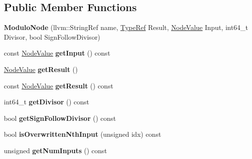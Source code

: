 \subsection*{Public Member Functions}
\begin{DoxyCompactItemize}
\item 
\mbox{\label{classglow_1_1_modulo_node_a1859853b905fcf3fc8984dd8b50b750f}} 
{\bfseries Modulo\+Node} (llvm\+::\+String\+Ref name, \hyperlink{structglow_1_1_type}{Type\+Ref} Result, \hyperlink{structglow_1_1_node_value}{Node\+Value} Input, int64\+\_\+t Divisor, bool Sign\+Follow\+Divisor)
\item 
\mbox{\label{classglow_1_1_modulo_node_a3dc9fccaff2389abe6e650c4c08a8a70}} 
const \hyperlink{structglow_1_1_node_value}{Node\+Value} {\bfseries get\+Input} () const
\item 
\mbox{\label{classglow_1_1_modulo_node_ae9e967d43d2823dd4b483b29899db5c0}} 
\hyperlink{structglow_1_1_node_value}{Node\+Value} {\bfseries get\+Result} ()
\item 
\mbox{\label{classglow_1_1_modulo_node_a77fa129d59227acd13745463de597bb9}} 
const \hyperlink{structglow_1_1_node_value}{Node\+Value} {\bfseries get\+Result} () const
\item 
\mbox{\label{classglow_1_1_modulo_node_af7e82fe400cb23405895a39edb2ba6f7}} 
int64\+\_\+t {\bfseries get\+Divisor} () const
\item 
\mbox{\label{classglow_1_1_modulo_node_a81cfb8ef10c17fd560f3b106eae4ec93}} 
bool {\bfseries get\+Sign\+Follow\+Divisor} () const
\item 
\mbox{\label{classglow_1_1_modulo_node_ae5fd163ccc64843c724e3c74a369525b}} 
bool {\bfseries is\+Overwritten\+Nth\+Input} (unsigned idx) const
\item 
\mbox{\label{classglow_1_1_modulo_node_a80a52dc5b537cf972b0164e154ffb09f}} 
unsigned {\bfseries get\+Num\+Inputs} () const
\item 
\mbox{\label{classglow_1_1_modulo_node_a0d25b54fe0a8b57429aa9aac920339ad}} 

\end{DoxyCompactItemize}
